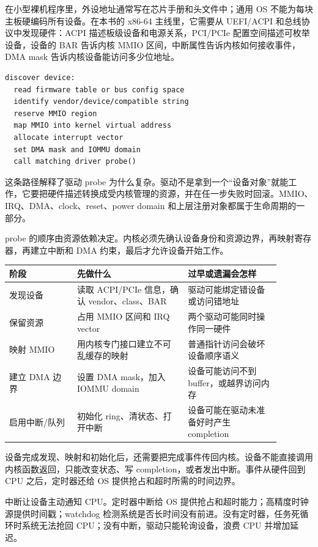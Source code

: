在小型裸机程序里，外设地址通常写在芯片手册和头文件中；通用 OS 不能为每块主板硬编码所有设备。在本书的 x86-64 主线里，它需要从 UEFI/ACPI 和总线协议中发现硬件：ACPI 描述板级设备和电源关系，PCI/PCIe 配置空间描述可枚举设备，设备的 BAR 告诉内核 MMIO 区间，中断属性告诉内核如何接收事件，DMA mask 告诉内核设备能访问多少位地址。

\begin{lstlisting}
discover device:
  read firmware table or bus config space
  identify vendor/device/compatible string
  reserve MMIO region
  map MMIO into kernel virtual address
  allocate interrupt vector
  set DMA mask and IOMMU domain
  call matching driver probe()
\end{lstlisting}

这条路径解释了驱动 probe 为什么复杂。驱动不是拿到一个“设备对象”就能工作，它要把硬件描述转换成受内核管理的资源，并在任一步失败时回滚。MMIO、IRQ、DMA、clock、reset、power domain 和上层注册对象都属于生命周期的一部分。

probe 的顺序由资源依赖决定。内核必须先确认设备身份和资源边界，再映射寄存器，再建立中断和 DMA 约束，最后才允许设备开始工作。

\begin{longtable}{p{0.22\linewidth}p{0.36\linewidth}p{0.3\linewidth}}
\toprule
阶段 & 先做什么 & 过早或遗漏会怎样 \\
\midrule
发现设备 & 读取 ACPI/PCIe 信息，确认 vendor、class、BAR & 驱动可能绑定错设备或访问错地址 \\
保留资源 & 占用 MMIO 区间和 IRQ vector & 两个驱动可能同时操作同一硬件 \\
映射 MMIO & 用内核专门接口建立不可乱缓存的映射 & 普通指针访问会破坏设备顺序语义 \\
建立 DMA 边界 & 设置 DMA mask，加入 IOMMU domain & 设备可能访问不到 buffer，或越界访问内存 \\
启用中断/队列 & 初始化 ring、清状态、打开中断 & 设备可能在驱动未准备好时产生 completion \\
\bottomrule
\end{longtable}

设备完成发现、映射和初始化后，还需要把完成事件传回内核。设备不能直接调用内核函数返回，只能改变状态、写 completion，或者发出中断。事件从硬件回到 CPU 之后，定时器还给 OS 提供抢占和超时所需的时间边界。

中断让设备主动通知 CPU。定时器中断给 OS 提供抢占和超时能力；高精度时钟源提供时间戳；watchdog 检测系统是否长时间没有前进。没有定时器，任务死循环时系统无法抢回 CPU；没有中断，驱动只能轮询设备，浪费 CPU 并增加延迟。

